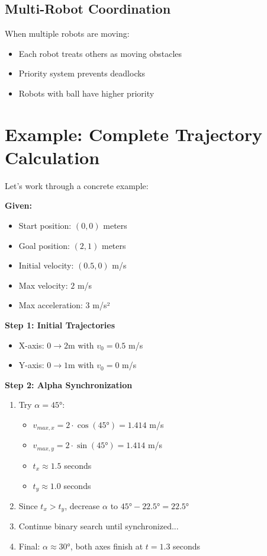 \documentclass[12pt,a4paper]{article}
\begin{document}
\subsection{Multi-Robot Coordination}

When multiple robots are moving:
\begin{itemize}
    \item Each robot treats others as moving obstacles
    \item Priority system prevents deadlocks
    \item Robots with ball have higher priority
\end{itemize}

\section{Example: Complete Trajectory Calculation}

Let's work through a concrete example:

\textbf{Given:}
\begin{itemize}
    \item Start position: $(0, 0)$ meters
    \item Goal position: $(2, 1)$ meters
    \item Initial velocity: $(0.5, 0)$ m/s
    \item Max velocity: $2$ m/s
    \item Max acceleration: $3$ m/s²
\end{itemize}

\textbf{Step 1: Initial Trajectories}
\begin{itemize}
    \item X-axis: $0 \to 2$m with $v_0 = 0.5$ m/s
    \item Y-axis: $0 \to 1$m with $v_0 = 0$ m/s
\end{itemize}

\textbf{Step 2: Alpha Synchronization}
\begin{enumerate}
    \item Try $\alpha = 45°$:
    \begin{itemize}
        \item $v_{max,x} = 2 \cdot \cos(45°) = 1.414$ m/s
        \item $v_{max,y} = 2 \cdot \sin(45°) = 1.414$ m/s
        \item $t_x \approx 1.5$ seconds
        \item $t_y \approx 1.0$ seconds
    \end{itemize}
    
    \item Since $t_x > t_y$, decrease $\alpha$ to $45° - 22.5° = 22.5°$
    
    \item Continue binary search until synchronized...
    
    \item Final: $\alpha \approx 30°$, both axes finish at $t = 1.3$ seconds
\end{enumerate}
\end{document}
